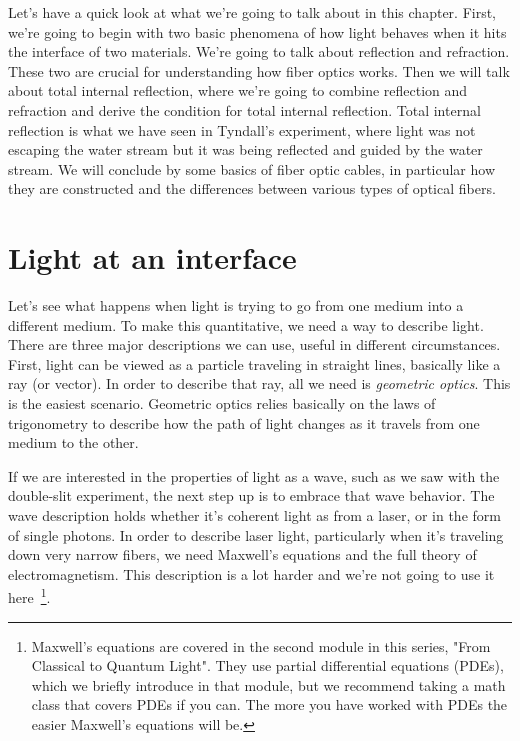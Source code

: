 Let's have a quick look at what we're going to talk about in this chapter. First, we're going to begin with two basic phenomena of how light behaves when it hits the interface of two materials. We're going to talk about reflection and refraction. These two are crucial for understanding how fiber optics works. Then we will talk about total internal reflection, where we're going to combine reflection and refraction and derive the condition for total internal reflection. Total internal reflection is what we have seen in Tyndall's experiment, where light was not escaping the water stream but it was being reflected and guided by the water stream. We will conclude by some basics of fiber optic cables, in particular how they are constructed and the differences between various types of optical fibers.


\section{Light at an interface}

Let's see what happens when light is trying to go from one medium into a different medium.  To make this quantitative, we need a way to describe light.  There are three major descriptions we can use, useful in different circumstances.  First, light can be viewed as a particle traveling in straight lines, basically like a ray (or vector). In order to describe that ray, all we need is \emph{geometric optics}. This is the easiest scenario. Geometric optics relies basically on the laws of trigonometry to describe how the path of light changes as it travels from one medium to the other.

If we are interested in the properties of light as a wave, such as we saw with the double-slit experiment, the next step up is to embrace that wave behavior.  The wave description holds whether it's coherent light as from a laser, or in the form of single photons. In order to describe laser light, particularly when it's traveling down very narrow fibers, we need Maxwell's equations and the full theory of electromagnetism. This description is a lot harder and we're not going to use it here~\footnote{Maxwell's equations are covered in the second module in this series, "From Classical to Quantum Light".  They use partial differential equations (PDEs), which we briefly introduce in that module, but we recommend taking a math class that covers PDEs if you can. The more you have worked with PDEs the easier Maxwell's equations will be.}.

